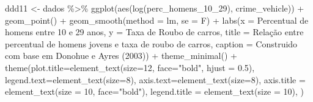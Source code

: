 \documentclass[
]{article}
\newenvironment{Shaded}{\begin{snugshade}}{\end{snugshade}}
\newcommand{\AttributeTok}[1]{\textcolor[rgb]{0.77,0.63,0.00}{#1}}
\newcommand{\DecValTok}[1]{\textcolor[rgb]{0.00,0.00,0.81}{#1}}
\newcommand{\FloatTok}[1]{\textcolor[rgb]{0.00,0.00,0.81}{#1}}
\newcommand{\FunctionTok}[1]{\textcolor[rgb]{0.00,0.00,0.00}{#1}}
\newcommand{\NormalTok}[1]{#1}
\newcommand{\OtherTok}[1]{\textcolor[rgb]{0.56,0.35,0.01}{#1}}
\newcommand{\SpecialCharTok}[1]{\textcolor[rgb]{0.00,0.00,0.00}{#1}}
\newcommand{\StringTok}[1]{\textcolor[rgb]{0.31,0.60,0.02}{#1}}
\begin{document}
\begin{Shaded}
\begin{Highlighting}[]
\NormalTok{ddd11 }\OtherTok{\textless{}{-}}\NormalTok{ dados }\SpecialCharTok{\%\textgreater{}\%} 
  \FunctionTok{ggplot}\NormalTok{(}\FunctionTok{aes}\NormalTok{(}\FunctionTok{log}\NormalTok{(perc\_homens\_10\_29), crime\_vehicle)) }\SpecialCharTok{+}
  \FunctionTok{geom\_point}\NormalTok{() }\SpecialCharTok{+} 
  \FunctionTok{geom\_smooth}\NormalTok{(}\AttributeTok{method =} \StringTok{\textquotesingle{}lm\textquotesingle{}}\NormalTok{, }\AttributeTok{se =}\NormalTok{ F) }\SpecialCharTok{+}
  \FunctionTok{labs}\NormalTok{(}\AttributeTok{x =} \StringTok{\textquotesingle{}Percentual de homens entre 10 e 29 anos\textquotesingle{}}\NormalTok{,}
       \AttributeTok{y =} \StringTok{\textquotesingle{}Taxa de Roubo de carros\textquotesingle{}}\NormalTok{,}
       \AttributeTok{title =} \StringTok{\textquotesingle{}Relação entre percentual de homens jovens e taxa de roubo de carros\textquotesingle{}}\NormalTok{,}
       \AttributeTok{caption =} \StringTok{\textquotesingle{}Construido com base em Donohue e Ayres (2003)\textquotesingle{}}\NormalTok{) }\SpecialCharTok{+} 
  \FunctionTok{theme\_minimal}\NormalTok{() }\SpecialCharTok{+}
  \FunctionTok{theme}\NormalTok{(}\AttributeTok{plot.title=}\FunctionTok{element\_text}\NormalTok{(}\AttributeTok{size=}\DecValTok{12}\NormalTok{, }\AttributeTok{face=}\StringTok{"bold"}\NormalTok{, }\AttributeTok{hjust =} \FloatTok{0.5}\NormalTok{),}
        \AttributeTok{legend.text=}\FunctionTok{element\_text}\NormalTok{(}\AttributeTok{size=}\DecValTok{8}\NormalTok{),}
        \AttributeTok{axis.text=}\FunctionTok{element\_text}\NormalTok{(}\AttributeTok{size=}\DecValTok{8}\NormalTok{),}
        \AttributeTok{axis.title =} \FunctionTok{element\_text}\NormalTok{(}\AttributeTok{size =} \DecValTok{10}\NormalTok{, }\AttributeTok{face=}\StringTok{"bold"}\NormalTok{),}
        \AttributeTok{legend.title =} \FunctionTok{element\_text}\NormalTok{(}\AttributeTok{size =} \DecValTok{10}\NormalTok{),}
\NormalTok{        )}


\end{Highlighting}
\end{Shaded}
\end{document}
